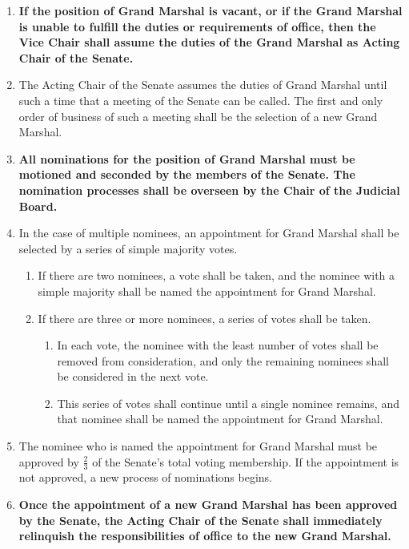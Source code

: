 \begin{enumerate}
    \item \textbf{If the position of Grand Marshal is vacant, or if the Grand Marshal is unable to fulfill the duties or requirements of office, then the Vice Chair shall assume the duties of the Grand Marshal as Acting Chair of the Senate.}

    \item The Acting Chair of the Senate assumes the duties of Grand Marshal until such a time that a meeting of the Senate can be
    called. The first and only order of business of such a meeting shall be the selection of a new Grand Marshal.

    \item \textbf{All nominations for the position of Grand Marshal must be motioned and seconded by the members of the Senate. The
    nomination processes shall be overseen by the Chair of the Judicial Board.}

    \item In the case of multiple nominees, an appointment for Grand Marshal shall be selected by a series of simple majority votes.
    \begin{enumerate}
        \item If there are two nominees, a vote shall be taken, and the nominee with a simple majority shall be named the appointment
        for Grand Marshal.

        \item If there are three or more nominees, a series of votes shall be taken.
        \begin{enumerate}
            \item In each vote, the nominee with the least number of votes shall be removed from consideration, and only the remaining
            nominees shall be considered in the next vote.

            \item This series of votes shall continue until a single nominee remains, and that nominee shall be named the appointment for
            Grand Marshal.
        \end{enumerate}
    \end{enumerate}

    \item The nominee who is named the appointment for Grand Marshal must be approved by $\frac{2}{3}$ of the Senate’s total voting membership. If the appointment is not approved, a new process of nominations begins.
    \item \textbf{Once the appointment of a new Grand Marshal has been approved by the Senate, the Acting Chair of the Senate shall immediately relinquish the responsibilities of office to the new Grand Marshal.}

\end{enumerate}
